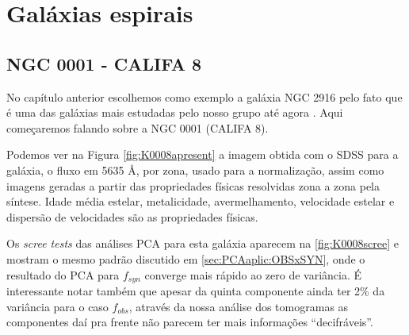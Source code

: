 \section{Galáxias espirais}
\label{sec:result:spirals}

\subsection{NGC 0001 - CALIFA 8}

No capítulo anterior escolhemos como exemplo a galáxia NGC 2916 pelo fato que é uma das galáxias mais estudadas pelo
nosso grupo até agora \citep{CidFernandes2013, CidFernandes2014}. Aqui começaremos falando sobre a NGC 0001 (CALIFA 8).

Podemos ver na Figura \ref{fig:K0008apresent} a imagem obtida com o SDSS para a galáxia, o fluxo em 5635 \AA, por zona,
usado para a normalização, assim como imagens geradas a partir das propriedades físicas resolvidas zona a zona pela
síntese. Idade média estelar, metalicidade, avermelhamento, velocidade estelar e dispersão de velocidades são
as propriedades físicas. 

Os {\em scree tests} das análises PCA para esta galáxia aparecem na \ref{fig:K0008scree} e mostram o mesmo padrão
discutido em \ref{sec:PCAaplic:OBSxSYN}, onde o resultado do PCA para $f_{syn}$ converge mais rápido ao zero de
variância. É interessante notar também que apesar da quinta componente ainda ter 2\% da variância para o caso $f_{obs}$,
através da nossa análise dos tomogramas as componentes daí pra frente não parecem ter mais informações ``decifráveis''.

